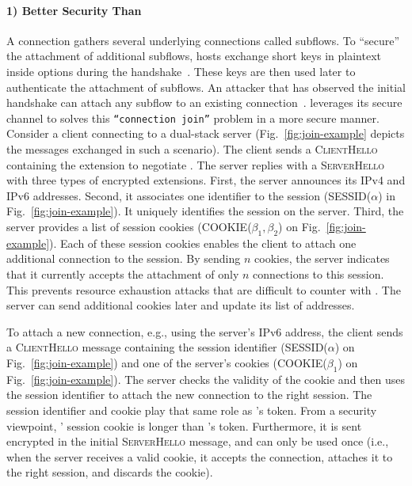 \paragraph*{1) Better Security Than \mptcp} A \mptcp connection gathers several
underlying connections called subflows. To ``secure'' the attachment of
additional subflows, \mptcp hosts exchange short keys in plaintext inside \tcp
options during the \tcp handshake~\cite{rfc6824, rfc8684}. These keys are then
used later to authenticate the attachment of subflows. An
attacker that has observed the initial handshake can attach any subflow to an
existing \mptcp connection~\cite{rfc6181}. \tcpls leverages its secure channel
to solves this \texttt{``connection join''} problem in a more secure
manner. Consider a client connecting to a dual-stack server
(Fig.~\ref{fig:join-example} depicts the \tls messages exchanged in such a
scenario). The client sends a \textsc{ClientHello} containing the \tls
extension to negotiate \tcpls. The server replies with a \textsc{ServerHello}
with three types of encrypted extensions. First, the server announces its IPv4
and IPv6 addresses. Second, it associates one identifier to the \tcpls session
(SESSID($\alpha$) in Fig.~\ref{fig:join-example}). It uniquely
identifies the \tcpls session on the server. Third, the server provides a list
of \tcpls session cookies (COOKIE($\beta_1,\beta_2$) on
Fig.~\ref{fig:join-example}). Each of these session cookies enables the client
to attach one additional \tcp connection to the \tcpls session. By sending $n$
cookies, the server indicates that it currently accepts the attachment of only
$n$ \tcp connections to this session. This prevents resource exhaustion attacks
that are difficult to counter with \mptcp. The server can send additional
cookies later and update its list of addresses.

To attach a new connection, e.g., using the server's IPv6 address, the client
sends a \textsc{ClientHello} message containing the session identifier
(SESSID($\alpha$) on Fig.~\ref{fig:join-example}) and one of the server's
cookies (COOKIE($\beta_1$) on Fig.~\ref{fig:join-example}). The server checks
the validity of the cookie and then uses the session identifier to attach the
new \tcp connection to the right \tcpls session. The session identifier and
cookie play that same role as \mptcp's token. From a security viewpoint, \tcpls'
session cookie is longer than \mptcp's token. Furthermore, it is sent encrypted
in the initial \textsc{ServerHello} message, and can only be used once (i.e.,
when the server receives a valid cookie, it accepts the connection, attaches it
to the right \tcpls session, and discards the cookie).

